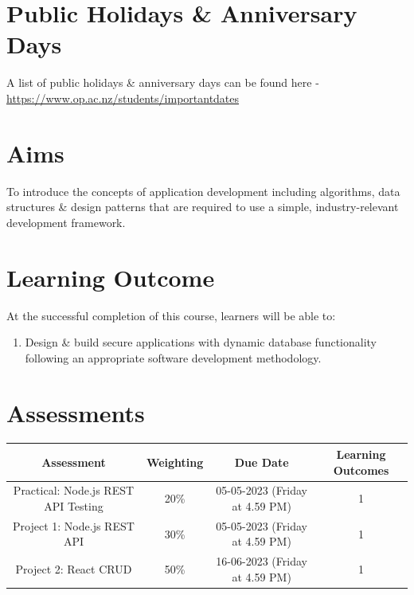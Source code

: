 \documentclass{article}
\begin{document}
\section*{Public Holidays \& Anniversary Days}
A list of public holidays \& anniversary days can be found here - \href{https://www.op.ac.nz/students/importantdates}{https://www.op.ac.nz/students/importantdates}

\section*{Aims}
To introduce the concepts of application development including algorithms, data structures \& design patterns that are required to use a simple, industry-relevant development framework.

\section*{Learning Outcome}
At the successful completion of this course, learners will be able to:
\begin{enumerate}
	\item Design \& build secure applications with dynamic database functionality following an appropriate software development methodology.
\end{enumerate}

\section*{Assessments}
\renewcommand{\arraystretch}{1.5}
\begin{tabular}{|c|c|c|c|}
	\hline
	\textbf{Assessment}                                 & \textbf{Weighting} & \textbf{Due Date}            & \textbf{Learning Outcomes} \\ \hline
	\small Practical: Node.js REST API Testing & \small 20\%        & \small 05-05-2023 (Friday at 4.59 PM)   & \small 1                   \\ \hline
	\small Project 1: Node.js REST API                  & \small 30\%        & \small \small 05-05-2023 (Friday at 4.59 PM) & \small 1                   \\ \hline
	\small Project 2: React CRUD                        & \small 50\%        & \small 16-06-2023 (Friday at 4.59 PM)  & \small 1                   \\ \hline
\end{tabular}
\end{document}

